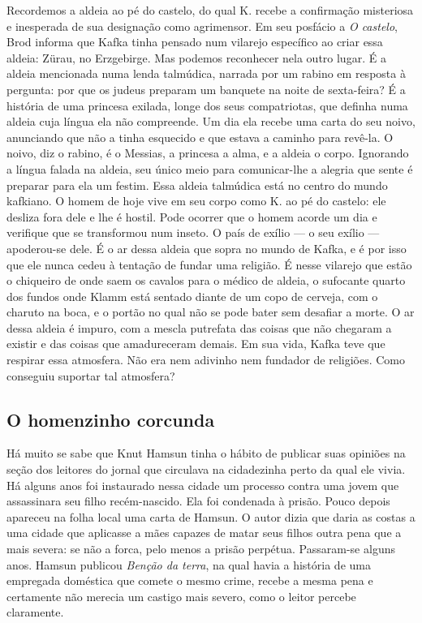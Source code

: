 Recordemos a aldeia ao pé do castelo, do qual K. recebe a confirmação
misteriosa e inesperada de sua designação como agrimensor. Em seu
posfácio a \textit{O castelo}, Brod informa que Kafka tinha pensado num
vilarejo específico ao criar essa aldeia: Zürau, no Erzgebirge. Mas
podemos reconhecer nela outro lugar. É a aldeia mencionada numa lenda
talmúdica, narrada por um rabino em resposta à pergunta: por que os
judeus preparam um banquete na noite de sexta-feira? É a história de uma
princesa exilada, longe dos seus compatriotas, que definha numa aldeia
cuja língua ela não compreende. Um dia ela recebe uma carta do seu
noivo, anunciando que não a tinha esquecido e que estava a caminho para
revê-la. O noivo, diz o rabino, é o Messias, a princesa a alma, e a
aldeia o corpo. Ignorando a língua falada na aldeia, seu único meio para
comunicar-lhe a alegria que sente é preparar para ela um festim. Essa
aldeia talmúdica está no centro do mundo kafkiano. O homem de hoje vive
em seu corpo como K. ao pé do castelo: ele desliza fora dele e lhe é
hostil. Pode ocorrer que o homem acorde um dia e verifique que se
transformou num inseto. O país de exílio --- o seu exílio ---
apoderou-se dele. É o ar dessa aldeia que sopra no mundo de Kafka, e é
por isso que ele nunca cedeu à tentação de fundar uma religião. É nesse
vilarejo que estão o chiqueiro de onde saem os cavalos para o médico de
aldeia, o sufocante quarto dos fundos onde Klamm está sentado diante de
um copo de cerveja, com o charuto na boca, e o portão no qual não se
pode bater sem desafiar a morte. O ar dessa aldeia é impuro, com a
mescla putrefata das coisas que não chegaram a existir e das coisas que
amadureceram demais. Em sua vida, Kafka teve que respirar essa
atmosfera. Não era nem adivinho nem fundador de religiões. Como
conseguiu suportar tal atmosfera?

\subsection{O homenzinho corcunda}

Há muito se sabe que Knut Hamsun tinha o hábito de publicar suas
opiniões na seção dos leitores do jornal que circulava na cidadezinha
perto da qual ele vivia. Há alguns anos foi instaurado nessa cidade um
processo contra uma jovem que assassinara seu filho recém-nascido. Ela
foi condenada à prisão. Pouco depois apareceu na folha local uma carta
de Hamsun. O autor dizia que daria as costas a uma cidade que aplicasse
a mães capazes de matar seus filhos outra pena que a mais severa: se não
a forca, pelo menos a prisão perpétua. Passaram-se alguns anos. Hamsun
publicou \textit{Benção da terra}, na qual havia a história de uma empregada
doméstica que comete o mesmo crime, recebe a mesma pena e certamente não
merecia um castigo mais severo, como o leitor percebe claramente.

